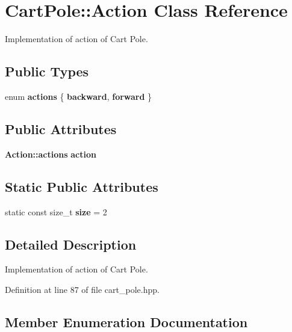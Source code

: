 \section{Cart\+Pole\+:\+:Action Class Reference}
\label{classmlpack_1_1rl_1_1CartPole_1_1Action}


Implementation of action of Cart Pole.  


\subsection*{Public Types}
\begin{DoxyCompactItemize}
\item 
enum \textbf{ actions} \{ \newline
\textbf{ backward}, 
\newline
\textbf{ forward}
 \}
\end{DoxyCompactItemize}
\subsection*{Public Attributes}
\begin{DoxyCompactItemize}
\item 
\textbf{ Action\+::actions} \textbf{ action}
\end{DoxyCompactItemize}
\subsection*{Static Public Attributes}
\begin{DoxyCompactItemize}
\item 
static const size\+\_\+t \textbf{ size} = 2
\end{DoxyCompactItemize}


\subsection{Detailed Description}
Implementation of action of Cart Pole. 

Definition at line 87 of file cart\+\_\+pole.\+hpp.



\subsection{Member Enumeration Documentation}
\mbox{\label{classmlpack_1_1rl_1_1CartPole_1_1Action_af806efc6052edbc741683ec893bb2fe1}} 
